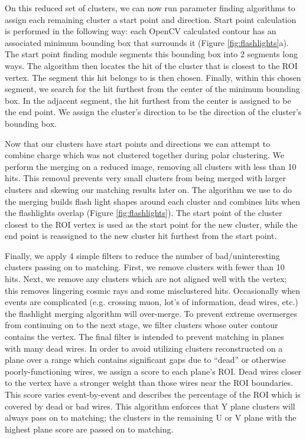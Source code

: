 \documentclass[12pt]{article}
\begin{document}
\par On this reduced set of clusters, we can now run parameter finding algorithms to assign each remaining cluster a start point and direction. Start point calculation is performed in the following way: each OpenCV calculated contour has an associated minimum bounding box that surrounds it (Figure \ref{fig:flashlights}a). The start point finding module segments this bounding box into 2 segments long ways. The algorithm then locates the hit of the cluster that is closest to the ROI vertex.  The segment this hit belongs to is then chosen. Finally, within this chosen segment, we search for the hit furthest from the center of the minimum bounding box. In the adjacent segment, the hit furthest from the center is assigned to be the end point. We assign the cluster's direction to be the direction of the cluster's bounding box.
\par Now that our clusters have start points and directions we can attempt to combine charge which was not clustered together during polar clustering. We perform the merging on a reduced image, removing all clusters with less than 10 hits. This removal prevents very small clusters from being merged with larger clusters and skewing our matching results later on.  The algorithm we use to do the merging builds flash light shapes around each cluster and combines hits when the flashlights overlap (Figure \ref{fig:flashlights}). The start point of the cluster closest to the ROI vertex is used as the start point for the new cluster, while the end point is reassigned to the new cluster hit furthest from the start point.
\par Finally, we apply 4 simple filters to reduce the number of bad/uninteresting clusters passing on to matching. First, we remove clusters with fewer than 10 hits.  Next, we remove any clusters which are not aligned well with the vertex; this removes lingering cosmic rays and some misclustered hits. Occasionally when events are complicated (e.g. crossing muon, lot's of information, dead wires, etc.) the flashlight merging algorithm will over-merge.  To prevent extreme overmerges from continuing on to the next stage, we filter clusters whose outer contour contains the vertex. The final filter is intended to prevent matching in planes with many dead wires.  In order to avoid utilizing clusters reconstructed on a plane over a range which contains significant gaps due to ``dead'' or otherwise poorly-functioning wires, we assign a score to each plane's ROI. Dead wires closer to the vertex have a stronger weight than those wires near the ROI boundaries. This score varies event-by-event and describes the percentage of the ROI which is covered by dead or bad wires. This algorithm enforces that Y plane clusters will always pass on to matching; the clusters in the remaining U or V plane with the highest plane score are passed on to matching. 
\end{document}
